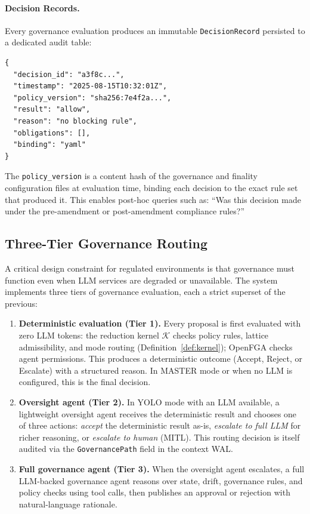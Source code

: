 \documentclass[11pt]{article}
\begin{document}
\paragraph{Decision Records.}
Every governance evaluation produces an immutable \texttt{DecisionRecord} persisted to a dedicated audit table:

\begin{lstlisting}
{
  "decision_id": "a3f8c...",
  "timestamp": "2025-08-15T10:32:01Z",
  "policy_version": "sha256:7e4f2a...",
  "result": "allow",
  "reason": "no blocking rule",
  "obligations": [],
  "binding": "yaml"
}
\end{lstlisting}

The \texttt{policy\_version} is a content hash of the governance and finality configuration files at evaluation time, binding each decision to the exact rule set that produced it. This enables post-hoc queries such as: ``Was this decision made under the pre-amendment or post-amendment compliance rules?''

\subsection{Three-Tier Governance Routing}
\label{sec:three-tier}

A critical design constraint for regulated environments is that governance must function even when LLM services are degraded or unavailable. The system implements three tiers of governance evaluation, each a strict superset of the previous:

\begin{enumerate}
  \item \textbf{Deterministic evaluation (Tier 1).} Every proposal is first evaluated with zero LLM tokens: the reduction kernel $\mathcal{K}$ checks policy rules, lattice admissibility, and mode routing (Definition~\ref{def:kernel}); OpenFGA checks agent permissions. This produces a deterministic outcome (Accept, Reject, or Escalate) with a structured reason. In MASTER mode or when no LLM is configured, this is the final decision.

  \item \textbf{Oversight agent (Tier 2).} In YOLO mode with an LLM available, a lightweight oversight agent receives the deterministic result and chooses one of three actions: \emph{accept} the deterministic result as-is, \emph{escalate to full LLM} for richer reasoning, or \emph{escalate to human} (MITL). This routing decision is itself audited via the \texttt{GovernancePath} field in the context WAL.

  \item \textbf{Full governance agent (Tier 3).} When the oversight agent escalates, a full LLM-backed governance agent reasons over state, drift, governance rules, and policy checks using tool calls, then publishes an approval or rejection with natural-language rationale.
\end{enumerate}
\end{document}
